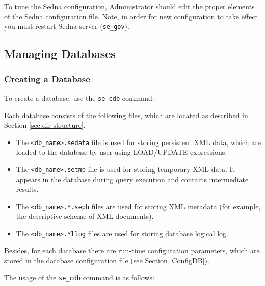 \documentclass[a4paper,12pt]{article}
\begin{document}
To tune the Sedna configuration, Administrator should edit the proper elements of the Sedna configuration file. Note, in order for new configuration to take effect you must restart Sedna server (\verb!se_gov!).

\subsection{Managing Databases}
\subsubsection{Creating a Database}
\label{CreateDB}
To create a database, use the \verb!se_cdb! command.

Each database consists of the following files, which are located as described in Section \ref{sec:dir-structure}.

\begin{itemize}
\item The \verb!<db_name>.sedata! file is used for storing persistent XML data, which are loaded to the database by user using LOAD/UPDATE expressions.
\item The \verb!<db_name>.setmp! file is used for storing temporary XML data. It appears in the database during query execution and contains intermediate results.
\item The \verb!<db_name>.*.seph! files are used for storing XML metadata (for example, the descriptive scheme of XML documents).
\item The \verb!<db_name>.*llog! files are used for storing database logical log.
\end{itemize}

Besides, for each database there are run-time configuration parameters, which are stored in the database configuration file (see Section \ref{ConfigDB}).

The usage of the \verb!se_cdb! command is as follows:
\end{document}
